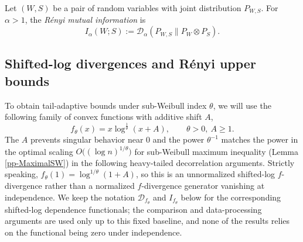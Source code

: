 \documentclass[11pt]{article}
\providecommand{\DD}{\mathcal{D}}
\providecommand{\Renyi}{R\'enyi }
\begin{document}





\begin{definition}\label{renyi_Mutual_information}
Let $(W,S)$ be a pair of random variables with joint distribution $P_{W,S}$.
For $\alpha>1$, the \emph{R\'enyi mutual information} is
\begin{equation}\label{eq:Renyi_MI}
I_\alpha(W;S):=\DD_\alpha(P_{W,S}\|P_W\otimes P_S).
\end{equation}
\end{definition}

\subsection{Shifted-log divergences and \Renyi upper bounds}

To obtain tail-adaptive bounds under sub-Weibull index $\theta$, we will use the
following family of convex functions with additive shift $A$,
\begin{equation}\label{eq:f_theta}
f_\theta(x)=x\log^{\frac{1}{\theta}}(x+A), \qquad \theta>0,\ A\ge 1.
\end{equation}
The $A$ prevents singular behavior near $0$ and the power $\theta^{-1}$ matches the power in the optimal scaling $O\bigl((\log n)^{1/\theta}\bigr)$ for sub-Weibull maximum inequality (Lemma \ref{pp-MaximalSW}) in the following heavy-tailed decorrelation arguments.
Strictly speaking, $f_\theta(1)=\log^{1/\theta}(1+A)$, so this is an
unnormalized shifted-log $f$-divergence rather than a normalized $f$-divergence
generator vanishing at independence.  We keep the notation $\DD_{f_\theta}$ and
$I_{f_\theta}$ below for the corresponding shifted-log dependence functionals;
the comparison and data-processing arguments are used only up to this fixed
baseline, and none of the results relies on the functional being zero under
independence.
\end{document}
